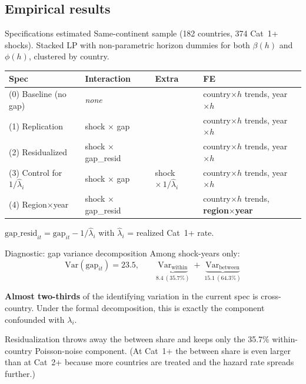 \documentclass[aspectratio=169]{beamer}
\begin{document}
\subsection{Empirical results}
\begin{frame}\subsectionpage\end{frame}

\begin{frame}{Specifications estimated}
\footnotesize
Same-continent sample (182 countries, 374 Cat~1+ shocks). Stacked LP with non-parametric horizon dummies for both $\beta(h)$ and $\phi(h)$, clustered by country.

\smallskip
\begin{tabular}{l l l l}
\hline
\textbf{Spec} & \textbf{Interaction} & \textbf{Extra} & \textbf{FE} \\
\hline
(0) Baseline (no gap)     & \emph{none}                   &                        & country$\times h$ trends, year$\times h$ \\
(1) Replication           & shock $\times$ gap            &                        & country$\times h$ trends, year$\times h$ \\
(2) Residualized          & shock $\times$ gap\_resid     &                        & country$\times h$ trends, year$\times h$ \\
(3) Control for $1/\hat\lambda_i$ & shock $\times$ gap            & shock $\times\,1/\hat\lambda_i$ & country$\times h$ trends, year$\times h$ \\
(4) Region$\times$year    & shock $\times$ gap\_resid     &                        & country$\times h$ trends, \textbf{region$\times$year} \\
\hline
\end{tabular}

\medskip
$\text{gap\_resid}_{it} = \text{gap}_{it} - 1/\hat\lambda_i$ with $\hat\lambda_i$ = realized Cat~1+ rate.
\end{frame}

\begin{frame}{Diagnostic: gap variance decomposition}
Among shock-years only:
\[
  \mathrm{Var}(\mathrm{gap}_{it}) = 23.5, \qquad
  \underbrace{\mathrm{Var}_{\text{within}}}_{8.4\ (35.7\%)} \;+\; \underbrace{\mathrm{Var}_{\text{between}}}_{15.1\ (64.3\%)}
\]

\medskip
\textbf{Almost two-thirds} of the identifying variation in the current spec is cross-country. Under the formal decomposition, this is exactly the component confounded with $\lambda_i$.

\medskip
Residualization throws away the between share and keeps only the 35.7\% within-country Poisson-noise component. (At Cat~1+ the between share is even larger than at Cat~2+ because more countries are treated and the hazard rate spreads further.)
\end{frame}
\end{document}
